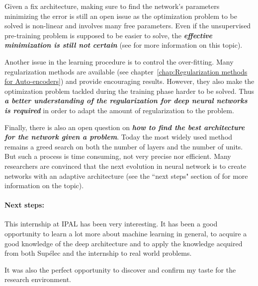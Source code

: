 \documentclass[a4paper,11pt]{report}
\newcommand{\Important}[1]{\textbf{{\em #1}}}
\begin{document}
    Given a fix architecture, making sure to find the network's parameters minimizing the error is still an open issue as the optimization problem to be solved is non-linear and involves many free parameters. Even if the unsupervised pre-training problem is supposed to be easier to solve, the \Important{effective minimization is still not certain} (see \cite{Xavier_2010} for more information on this topic).\\\par
    
    Another issue in the learning procedure is to control the over-fitting. Many regularization methods are available (see chapter~\ref{chap:Regularization methods for Auto-encoders}) and provide encouraging results. However, they also make the optimization problem tackled during the training phase harder to be solved. Thus \Important{a better understanding of the regularization for deep neural networks is required} in order to adapt the amount of regularization to the problem.\\\par
    
    Finally, there is also an open question on \Important{how to find the best architecture for the network given a problem}. Today the most widely used method remains a greed search on both the number of layers and the number of units. But such a process is time consuming, not very precise nor efficient. Many researchers are convinced that the next evolution in neural network is to create  networks with an adaptive architecture (see the ``next steps" section of \cite{Bengio_2009} for more information on the topic).\\\par
    
  \paragraph{Next steps:}
    This internship at IPAL has been very interesting. It has been a good opportunity to learn a lot more about machine learning in general, to acquire a good knowledge of the deep architecture and to apply the knowledge acquired from both Supélec and the internship to real world problems.\\\par
    
    It was also the perfect opportunity to discover and confirm my taste for the research environment.
    
    
\end{document}
